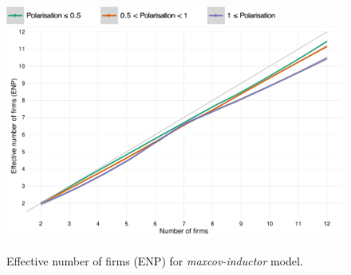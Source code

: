 \documentclass[preprint, 12pt]{elsarticle}
\begin{document}
\begin{figure}[ht!]
	\centering
	\includegraphics[width=90mm]{Graphics/legend_pol.pdf}
	\includegraphics[width=\textwidth]{Graphics/fig612a.pdf}
	\caption{Effective number of firms (ENP) for \emph{maxcov-inductor} model.}
	\label{fig:enp_mi}
\end{figure}
\end{document}
